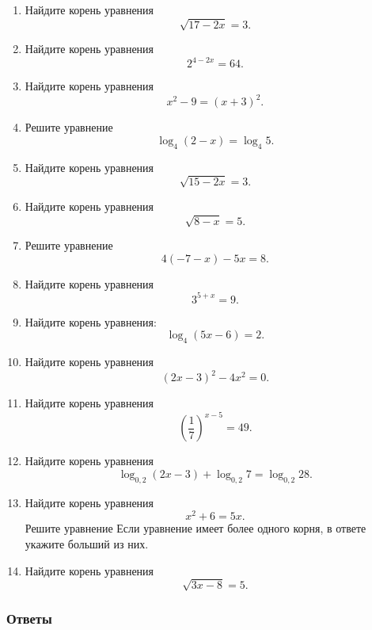 \begin{enumerate}
  Найдите корень уравнения \[-7 + 2(3 - 2x) = -3x + 8.\]
\item
  Найдите корень уравнения \[\sqrt{17 - 2x} = 3.\]
\item
  Найдите корень уравнения \[2^{4 - 2x} = 64.\]
\item
  Найдите корень уравнения \[x^2 - 9 = (x + 3)^2.\]
\item
  Решите уравнение \[\log_{4}(2 - x) = \log_{4}5.\]
\item
  Найдите корень уравнения \[\sqrt{15 - 2x} = 3.\]
\item
  Найдите корень уравнения \[\sqrt{8 - x} = 5.\]
\item
  Решите уравнение \[4(-7 - x) - 5x = 8.\]
\item
  Найдите корень уравнения \[3^{5 + x} = 9.\]
\item
  Найдите корень уравнения: \[\log_{4}(5x - 6) = 2.\]
\item
  Найдите корень уравнения \[(2x - 3)^2 - 4x^2 = 0.\]
\item
  Найдите корень уравнения \[\left(\frac{1}{7}\right)^{x - 5} = 49.\]
\item
  Найдите корень уравнения
  \[\log_{0,2}(2x - 3) + \log_{0,2}7 = \log_{0,2}28.\]
\item
  Найдите корень уравнения \[x^2 + 6 = 5x.\] Решите уравнение Если
  уравнение имеет более одного корня, в ответе укажите больший из них.
\item
  Найдите корень уравнения \[\sqrt{3x - 8} = 5.\]
\end{enumerate}

\subsubsection{Ответы}\label{ux43eux442ux432ux435ux442ux44b}

